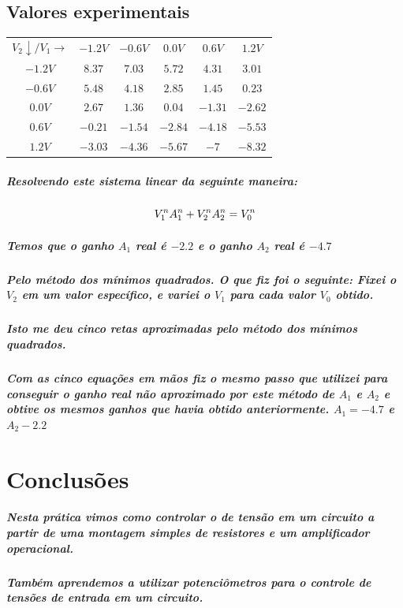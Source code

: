 \documentclass[12pt,twoside, a4paper, twocolumn]{article}
\begin{document}
\subsection{Valores experimentais}

\begin{center}
    \begin{tabular}{ |c|ccccc| }
        \hline
        $V_2 \downarrow / V_1 \rightarrow $ & $-1.2V$ & $-0.6V$ & $0.0V$  & $0.6V$  & $1.2V$  \\
        $-1.2V$                             & $8.37$  & $7.03$  & $5.72$  & $4.31$  & $3.01$  \\
        $ -0.6V$                            & $5.48$  & $4.18$  & $2.85$  & $1.45$  & $0.23$  \\
        $0.0V$                              & $2.67$  & $1.36$  & $0.04$  & $-1.31$ & $-2.62$ \\
        $ 0.6V$                             & $-0.21$ & $-1.54$ & $-2.84$ & $-4.18$ & $-5.53$ \\
        $ 1.2V$                             & $-3.03$ & $-4.36$ & $-5.67$ & $-7$    & $-8.32$ \\
        \hline
    \end{tabular}
\end{center}

\subparagraph*{Resolvendo este sistema linear da seguinte maneira:}

\begin{equation}
    V_1^n A_1^n + V_2^n A_2^n = V_0^n \\
\end{equation}


\subparagraph*{Temos que o ganho $A_1$ real é $-2.2$ e o ganho $A_2$ real é $-4.7$}

\subparagraph*{Pelo método dos mínimos quadrados. O que fiz foi o seguinte: Fixei o $V_2$ em um valor específico, e variei o $V_1$ para cada valor $V_0$ obtido.}

\subparagraph*{Isto me deu cinco retas aproximadas pelo método dos mínimos quadrados.}

\subparagraph*{Com as cinco equações em mãos fiz o mesmo passo que utilizei para conseguir o ganho real não aproximado por este método de $A_1$ e $A_2$ e obtive os mesmos ganhos que havia obtido anteriormente. $A_1 = -4.7$ e $A_2 -2.2$}



\section{Conclusões}

\subparagraph*{Nesta prática vimos como controlar o de tensão em um circuito a partir de uma montagem simples de resistores e um amplificador operacional.}

\subparagraph*{Também aprendemos a utilizar potenciômetros para o controle de tensões de entrada em um circuito.}
\end{document}

